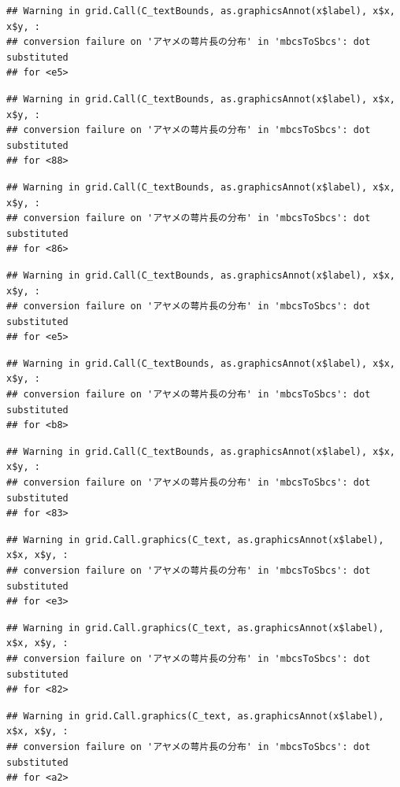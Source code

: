 \documentclass[
]{book}
\begin{document}
\begin{verbatim}
## Warning in grid.Call(C_textBounds, as.graphicsAnnot(x$label), x$x, x$y, :
## conversion failure on 'アヤメの萼片長の分布' in 'mbcsToSbcs': dot substituted
## for <e5>
\end{verbatim}

\begin{verbatim}
## Warning in grid.Call(C_textBounds, as.graphicsAnnot(x$label), x$x, x$y, :
## conversion failure on 'アヤメの萼片長の分布' in 'mbcsToSbcs': dot substituted
## for <88>
\end{verbatim}

\begin{verbatim}
## Warning in grid.Call(C_textBounds, as.graphicsAnnot(x$label), x$x, x$y, :
## conversion failure on 'アヤメの萼片長の分布' in 'mbcsToSbcs': dot substituted
## for <86>
\end{verbatim}

\begin{verbatim}
## Warning in grid.Call(C_textBounds, as.graphicsAnnot(x$label), x$x, x$y, :
## conversion failure on 'アヤメの萼片長の分布' in 'mbcsToSbcs': dot substituted
## for <e5>
\end{verbatim}

\begin{verbatim}
## Warning in grid.Call(C_textBounds, as.graphicsAnnot(x$label), x$x, x$y, :
## conversion failure on 'アヤメの萼片長の分布' in 'mbcsToSbcs': dot substituted
## for <b8>
\end{verbatim}

\begin{verbatim}
## Warning in grid.Call(C_textBounds, as.graphicsAnnot(x$label), x$x, x$y, :
## conversion failure on 'アヤメの萼片長の分布' in 'mbcsToSbcs': dot substituted
## for <83>
\end{verbatim}

\begin{verbatim}
## Warning in grid.Call.graphics(C_text, as.graphicsAnnot(x$label), x$x, x$y, :
## conversion failure on 'アヤメの萼片長の分布' in 'mbcsToSbcs': dot substituted
## for <e3>
\end{verbatim}

\begin{verbatim}
## Warning in grid.Call.graphics(C_text, as.graphicsAnnot(x$label), x$x, x$y, :
## conversion failure on 'アヤメの萼片長の分布' in 'mbcsToSbcs': dot substituted
## for <82>
\end{verbatim}

\begin{verbatim}
## Warning in grid.Call.graphics(C_text, as.graphicsAnnot(x$label), x$x, x$y, :
## conversion failure on 'アヤメの萼片長の分布' in 'mbcsToSbcs': dot substituted
## for <a2>
\end{verbatim}
\end{document}
